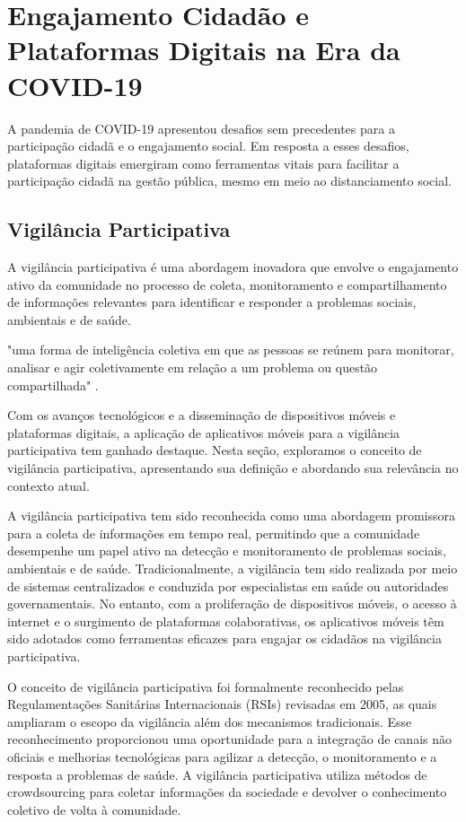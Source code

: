 \section*{Engajamento Cidadão e Plataformas Digitais na Era da COVID-19}
A pandemia de COVID-19 apresentou desafios sem precedentes para a participação cidadã e o engajamento social. Em resposta a esses desafios, plataformas digitais emergiram como ferramentas vitais para facilitar a participação cidadã na gestão pública, mesmo em meio ao distanciamento social.

\subsection*{Vigilância Participativa}
A vigilância participativa é uma abordagem inovadora que envolve o engajamento ativo da comunidade no processo de coleta, monitoramento e compartilhamento de informações relevantes para identificar e responder a problemas sociais, ambientais e de saúde. 

\begin{citacao}
	"uma forma de inteligência coletiva em que as pessoas se reúnem para monitorar, analisar e agir coletivamente em relação a um problema ou questão compartilhada" \cite[p. 1]{2011_Bryer}.
\end{citacao}

Com os avanços tecnológicos e a disseminação de dispositivos móveis e plataformas digitais, a aplicação de aplicativos móveis para a vigilância participativa tem ganhado destaque. Nesta seção, exploramos o conceito de vigilância participativa, apresentando sua definição e abordando sua relevância no contexto atual.

A vigilância participativa tem sido reconhecida como uma abordagem promissora para a coleta de informações em tempo real, permitindo que a comunidade desempenhe um papel ativo na detecção e monitoramento de problemas sociais, ambientais e de saúde. Tradicionalmente, a vigilância tem sido realizada por meio de sistemas centralizados e conduzida por especialistas em saúde ou autoridades governamentais. No entanto, com a proliferação de dispositivos móveis, o acesso à internet e o surgimento de plataformas colaborativas, os aplicativos móveis têm sido adotados como ferramentas eficazes para engajar os cidadãos na vigilância participativa.

O conceito de vigilância participativa foi formalmente reconhecido pelas Regulamentações Sanitárias Internacionais (RSIs) revisadas em 2005, as quais ampliaram o escopo da vigilância além dos mecanismos tradicionais. Esse reconhecimento proporcionou uma oportunidade para a integração de canais não oficiais e melhorias tecnológicas para agilizar a detecção, o monitoramento e a resposta a problemas de saúde. A vigilância participativa utiliza métodos de crowdsourcing para coletar informações da sociedade e devolver o conhecimento coletivo de volta à comunidade.\cite[1]{2017_Smolinski}

